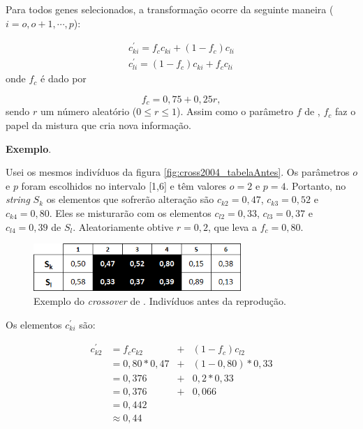 	Para todos genes selecionados, a transformação ocorre da seguinte maneira ($i = o, o + 1, \cdots, p$):
	
	\begin{equation}
		\begin{array}{l}
			c^{'}_{ki} = f_c c_{ki} + (1 - f_c) c_{li}     \\
			c^{'}_{li} = (1 - f_c) c_{ki} + f_c c_{li}
		\end{array}
	\end{equation}
	onde $f_c$ é dado por
	
	\begin{equation}
		f_c = 0,75 + 0,25r,
	\end{equation}
	sendo $r$ um número aleatório ($0 \leq r \leq 1$). Assim como o parâmetro $f$ de \cite{metodo2004}, $f_c$ faz o papel da mistura que cria nova informação.
	
	\textbf{Exemplo}.
	
	
	Usei os mesmos indivíduos da figura \ref{fig:cross2004_tabelaAntes}. Os parâmetros $o$ e $p$ foram escolhidos no intervalo [1,6] e têm valores $o = 2$ e $p = 4$. Portanto, no \emph{string} $S_k$ os elementos que sofrerão alteração são $c_{k2} = 0,47$, $c_{k3} = 0,52$ e $c_{k4} = 0,80$. Eles se misturarão com os elementos $c_{l2} = 0,33$, $c_{l3} = 0,37$ e $c_{l4} = 0,39$ de $S_l$. Aleatoriamente obtive $r = 0,2$, que leva a $f_c = 0,80$.
	
	\begin{figure}[htbp]
	\centering
		\includegraphics[width=0.70\textwidth]{figs/materiais_metodo/autovalores_com_ga/cross2011_tabelaAntes.png}
	\caption{Exemplo do \emph{crossover} de \cite{metodo2011}. Indivíduos antes da reprodução.}
	\label{fig:cross2011_tabelaAntes}
\end{figure}
	
	Os elementos $c^{'}_{ki}$ são:
	
	\begin{equation}
		\begin{array}{llcl}
			c^{'}_{k2}	& = f_c c_{k2} 		& + & (1- f_c) c_{l2} \\
									& = 0,80 * 0,47		& + &	(1 - 0,80) * 0,33 \\
									& = 0,376					& + & 0,2 * 0,33	\\
									& = 0,376					& + & 0,066	\\
									& = 0,442 \\
									& \approx 0,44
		\end{array}
	\end{equation}
	
